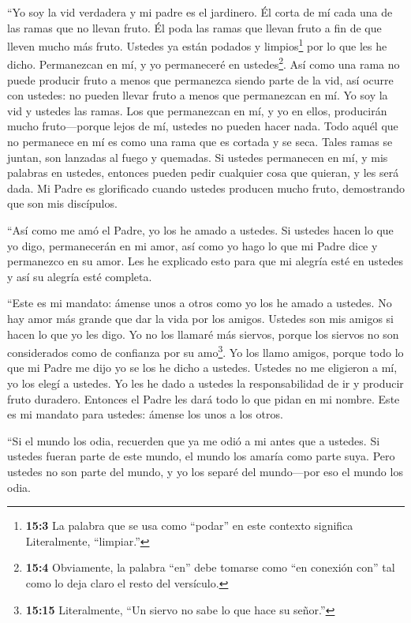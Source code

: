  ``Yo soy la vid verdadera y mi padre es el jardinero.
 Él corta de mí cada una de las ramas que no llevan fruto.
Él poda las ramas que llevan fruto a fin de que lleven mucho más fruto.
 Ustedes ya están podados y limpios\footnote{\textbf{15:3}
  La palabra que se usa como ``podar'' en este contexto significa
  Literalmente, ``limpiar.''} por lo que les he dicho. 
Permanezcan en mí, y yo permaneceré en ustedes\footnote{\textbf{15:4}
  Obviamente, la palabra ``en'' debe tomarse como ``en conexión con''
  tal como lo deja claro el resto del versículo.}. Así como una rama no
puede producir fruto a menos que permanezca siendo parte de la vid, así
ocurre con ustedes: no pueden llevar fruto a menos que permanezcan en
mí.  Yo soy la vid y ustedes las ramas. Los que permanezcan
en mí, y yo en ellos, producirán mucho fruto---porque lejos de mí,
ustedes no pueden hacer nada.  Todo aquél que no permanece
en mí es como una rama que es cortada y se seca. Tales ramas se juntan,
son lanzadas al fuego y quemadas.  Si ustedes permanecen en
mí, y mis palabras en ustedes, entonces pueden pedir cualquier cosa que
quieran, y les será dada.  Mi Padre es glorificado cuando
ustedes producen mucho fruto, demostrando que son mis discípulos.

 ``Así como me amó el Padre, yo los he amado a ustedes.
 Si ustedes hacen lo que yo digo, permanecerán en mi amor,
así como yo hago lo que mi Padre dice y permanezco en su amor.
 Les he explicado esto para que mi alegría esté en ustedes
y así su alegría esté completa.

 ``Este es mi mandato: ámense unos a otros como yo los he
amado a ustedes.  No hay amor más grande que dar la vida
por los amigos.  Ustedes son mis amigos si hacen lo que yo
les digo.  Yo no los llamaré más siervos, porque los
siervos no son considerados como de confianza por su amo\footnote{\textbf{15:15}
  Literalmente, ``Un siervo no sabe lo que hace su señor.''}. Yo los
llamo amigos, porque todo lo que mi Padre me dijo yo se los he dicho a
ustedes.  Ustedes no me eligieron a mí, yo los elegí a
ustedes. Yo les he dado a ustedes la responsabilidad de ir y producir
fruto duradero. Entonces el Padre les dará todo lo que pidan en mi
nombre.  Este es mi mandato para ustedes: ámense los unos a
los otros.

 ``Si el mundo los odia, recuerden que ya me odió a mi
antes que a ustedes.  Si ustedes fueran parte de este
mundo, el mundo los amaría como parte suya. Pero ustedes no son parte
del mundo, y yo los separé del mundo---por eso el mundo los odia.

